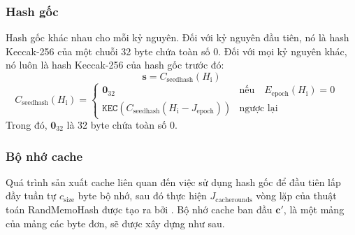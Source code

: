 \documentclass[9pt,oneside]{amsart}
\begin{document}
\subsubsection{Hash gốc}
Hash gốc khác nhau cho mỗi kỷ nguyên. Đối với kỷ nguyên đầu tiên, nó là hash Keccak-256 của một chuỗi 32 byte chứa toàn số 0. Đối với mọi kỷ nguyên khác, nó luôn là hash Keccak-256 của hash gốc trước đó:
\begin{equation}
 \mathbf{s} = C_{\mathrm{seedhash}}(H_{\mathrm{i}})
\end{equation}
\begin{equation}
 C_{\mathrm{seedhash}}(H_{\mathrm{i}}) = \begin{cases}
\mathbf{0}_{32} & \text{nếu} \quad E_{\mathrm{epoch}}(H_{\mathrm{i}}) = 0 \quad  \\
\texttt{KEC}(C_{\mathrm{seedhash}}(H_{\mathrm{i}} - J_{\mathrm{epoch}})) & \text{ngược lại}
\end{cases}
\end{equation}
Trong đó, $\mathbf{0}_{32}$ là 32 byte chứa toàn số 0.


\subsubsection{Bộ nhớ cache}
Quá trình sản xuất cache liên quan đến việc sử dụng hash gốc để đầu tiên lấp đầy tuần tự $c_{\mathrm{size}}$ byte bộ nhớ, sau đó thực hiện $J_{\mathrm{cacherounds}}$ vòng lặp của thuật toán RandMemoHash được tạo ra bởi \cite{lerner2014randmemohash}. Bộ nhớ cache ban đầu $\mathbf{c'}$, là một mảng của mảng các byte đơn, sẽ được xây dựng như sau.
\end{document}
